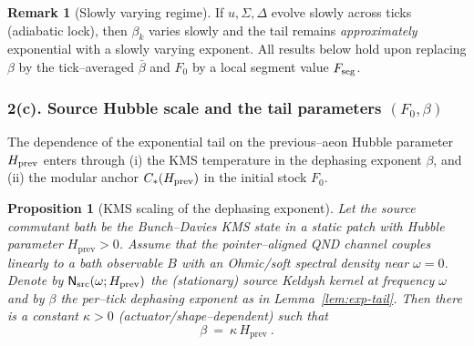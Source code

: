 \documentclass[10pt]{article}
\theoremstyle{definition}
\newtheorem{remark}{Remark}[section]
\theoremstyle{plain}
\newtheorem{proposition}{Proposition}[section]
\begin{document}
\begin{remark}[Slowly varying regime]
\label{rem:uom-main-008}
If $u,\Sigma,\Delta$ evolve slowly across ticks (adiabatic lock), then $\beta_k$ varies slowly and the tail
remains \emph{approximately} exponential with a slowly varying exponent. All results below hold upon replacing
$\beta$ by the tick–averaged $\bar\beta$ and $F_0$ by a local segment value $F_{\rm seg}$.
\end{remark}

\subsubsection*{\texorpdfstring{2(c). Source Hubble scale and the tail parameters $(F_0,\beta)$}{2(c). Source Hubble scale and the tail parameters (F_0,beta)}}
\label{subsubsec:hubble-tail}
The dependence of the exponential tail on the previous–aeon Hubble parameter $H_{\rm prev}$ enters through
(i) the KMS temperature in the dephasing exponent $\beta$, and (ii) the modular anchor $C_\ast(H_{\rm prev})$
in the initial stock $F_0$.

\begin{proposition}[KMS scaling of the dephasing exponent]\label{prop:kms-beta}
Let the source commutant bath be the Bunch–Davies KMS state in a static patch with Hubble parameter
$H_{\mathrm{prev}}>0$. Assume that the pointer–aligned QND channel couples linearly to a bath observable
$B$ with an Ohmic/soft spectral density near $\omega=0$. Denote by $\mathsf N_{\rm src}(\omega;H_{\mathrm{prev}})$
the (stationary) source Keldysh kernel at frequency $\omega$ and by $\beta$ the per–tick dephasing exponent
as in Lemma~\ref{lem:exp-tail}. Then there is a constant $\kappa>0$ (actuator/shape–dependent) such that
\begin{equation}\label{eq:kms-scaling}
\boxed{\qquad \beta\ =\ \kappa\,H_{\mathrm{prev}}\ .\qquad}
\end{equation}
\end{proposition}
\end{document}

